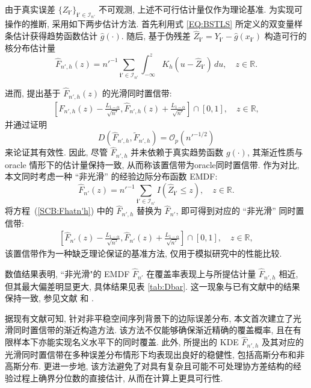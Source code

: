 \documentclass[a4paper,openay,14pt]{ctexbook}
\numberwithin{equation}{section}
\numberwithin{lem}{section}
\begin{document}
由于真实误差 $\{Z_{\mathbf{i}'}\}_{\mathbf{i}' \in \mathcal{I}_{n'}}$ 不可观测, 上述不可行估计量仅作为理论基准. 为实现可操作的推断, 采用如下两步估计方法. 首先利用式 \eqref{EQ:BSTLS} 所定义的双变量样条估计获得趋势函数估计 $\hat{g}(\cdot)$. 随后, 基于伪残差
$\hat{Z}_{\mathbf{i}'} = Y_{\mathbf{i}'} - \hat{g}(x_{\mathbf{i}'})$
构造可行的核分布估计量
\begin{equation}\label{EQ:Fn'hhat}
\hat{F}_{n',h}(z)
= n'^{-1} \sum_{\mathbf{i}' \in \mathcal{I}_{n'}}
\int_{-\infty}^{z} K_h(u - \hat{Z}_{\mathbf{i}'}) \, du,
\quad z \in \mathbb{R}.
\end{equation}

进而, 提出基于 $\hat{F}_{n',h}(z)$ 的光滑同时置信带:
\begin{align}\label{SCB:Fhatn'h}
\left[
\hat{F}_{n',h}(z) - \frac{L_{1-\alpha}}{\sqrt{n'}},
\hat{F}_{n',h}(z) + \frac{L_{1-\alpha}}{\sqrt{n'}}
\right] \cap [0,1], 
\quad z \in \mathbb{R},
\end{align}
并通过证明
\[
D\left(\hat{F}_{n',h}, \tilde{F}_{n',h}\right)
= \mathcal{O}_p(n'^{-1/2})
\]
来论证其有效性. 因此, 尽管 $\hat{F}_{n',h}$ 并未依赖于真实趋势函数 $g(\cdot)$, 其渐近性质与 oracle 情形下的估计量保持一致, 从而称该置信带为oracle同时置信带.
作为对比, 本文同时考虑一种 ``非光滑'' 的经验边际分布函数 EMDF:
\begin{equation} \label{EQ:Fn'hat}
    \hat{F}_{n'}(z) = n'^{-1}\sum_{\mathbf{i}'\in\mathcal{I}_{n'}} I(\hat{Z}_{\mathbf{i}'} \le z), \quad z \in \mathbb{R}.
\end{equation}
将方程~(\ref{SCB:Fhatn'h}) 中的 $\hat{F}_{n',h}$ 替换为 $\hat{F}_{n'}$, 即可得到对应的 ``非光滑'' 同时置信带:
\begin{align} \label{SCB:Fhatn'}
    \left[ \hat{F}_{n'}(z) - \frac{L_{1-\alpha}}{\sqrt{n'}},  \hat{F}_{n'}(z) + \frac{L_{1-\alpha}}{\sqrt{n'}} \right] \cap [0,1], \quad z \in \mathbb{R},
\end{align}
该置信带作为一种缺乏理论保证的基准方法, 仅用于模拟研究中的性能比较.


数值结果表明, ``非光滑"的 EMDF $\hat{F}_{n'}$ 在覆盖率表现上与所提估计量 $\hat{F}_{n',h}$ 相近, 但其最大偏差明显更大, 具体结果见表 \ref{tab:Dbar}. 这一现象与已有文献中的结果保持一致, 参见文献\cite{gu2021smooth} 和 \cite{wang2022oracle}.

据现有文献可知, 针对非平稳空间序列背景下的边际误差分布, 本文首次建立了光滑同时置信带的渐近构造方法. 该方法不仅能够确保渐近精确的覆盖概率, 且在有限样本下亦能实现名义水平下的同时覆盖. 此外, 所提出的 KDE $\hat{F}_{n',h}$ 及其对应的光滑同时置信带在多种误差分布情形下均表现出良好的稳健性, 包括高斯分布和非高斯分布. 更进一步地, 该方法避免了对具有复杂且可能不可处理协方差结构的经验过程上确界分位数的直接估计, 从而在计算上更具可行性.
\end{document}
